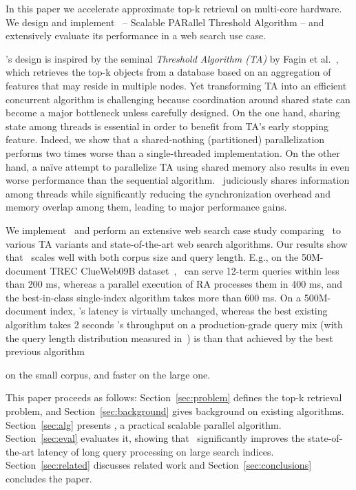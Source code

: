 In this paper we accelerate approximate top-k retrieval on multi-core hardware. 
We design and implement  \emph{\alg}~-- {Scalable PARallel Threshold Algorithm} --  
 and extensively evaluate its performance in 
a web search use case. 

\alg's design is inspired by the seminal \emph{Threshold Algorithm (TA)} by Fagin et al.~\cite{Fagin:2003}, which
retrieves the top-k objects from a database based on an aggregation of features that may reside in multiple nodes. 
Yet 
transforming TA into an efficient concurrent algorithm is challenging because coordination around 
shared state can become a major bottleneck unless carefully designed. On the one hand,
sharing state among threads is essential in order to benefit from TA's early stopping feature.
Indeed, we show  that a shared-nothing (partitioned) parallelization  performs two times 
worse than a single-threaded implementation. On the other hand, 
a na\"ive attempt to parallelize TA using shared memory also results in even 
worse performance than the sequential algorithm. \alg\ judiciously shares 
information among threads while significantly reducing the synchronization 
overhead and memory overlap among them, 
leading to major performance gains. 

We implement \alg\ and perform an extensive web search case study comparing \alg\ to various TA variants and 
state-of-the-art web search algorithms. 
Our results show that \alg\ scales well with both  corpus size and query length.
E.g., on the 50M-document TREC ClueWeb09B dataset~\cite{ClueWeb09}, 
\alg\ can serve  12-term queries within less than 200 ms, 
whereas a parallel execution of RA processes them in 400 ms, and the best-in-class single-index algorithm  
takes more than 600 ms. 
%
On a 500M-document index,  \alg's latency is virtually unchanged, whereas 
the best existing algorithm
 takes 2 seconds  
 \alg's throughput on a production-grade query mix (with the query length distribution measured in~\cite{sigir/Guy16}) is 
 than that achieved by the best previous algorithm  

 on the small corpus, and  faster on the large one.

This paper proceeds as follows: 
Section~\ref{sec:problem} defines the top-k retrieval problem, and  
Section~\ref{sec:background} gives background on existing algorithms. 
Section~\ref{sec:alg} presents \alg, a practical scalable parallel algorithm. 
Section~\ref{sec:eval}  evaluates it, showing  that \alg\  significantly improves the state-of-the-art latency  of long query processing on large search indices.
Section~\ref{sec:related} discusses related work and Section~\ref{sec:conclusions} concludes the paper.
